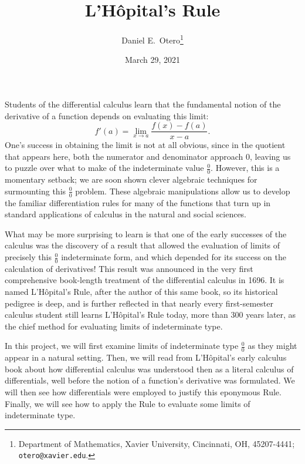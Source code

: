 \message{ !name(LHopitalsRule_2021.03.29.tex)}\documentclass[11pt]{article}
\begin{document}


\title{L'H\^opital's Rule}
\author{Daniel E.~Otero\thanks{Department of Mathematics, Xavier University, Cincinnati, OH, 45207-4441; \texttt{otero@xavier.edu}.
}}
\date{March 29, 2021}
\bigskip



\maketitle

Students of the differential calculus learn that the fundamental notion of the derivative of a function depends on evaluating this limit: $$f'(a)=\lim_{x\to a} \frac{f(x)-f(a)}{x-a}.$$One's success in obtaining the limit is not at all obvious, since in the quotient that appears here, both the numerator and denominator approach $0$, leaving us to puzzle over what to make of the indeterminate value ${\displaystyle \frac00}$. However, this is a momentary setback; we are soon shown clever algebraic techniques for surmounting this ${\displaystyle \frac00}$ problem. These algebraic manipulations allow us to develop the familiar differentiation rules for many of the functions that turn up in standard applications of calculus in the natural and social sciences.

What may be more surprising to learn is that one of the early successes of the calculus was the discovery of a result that allowed the evaluation of limits of precisely this ${\displaystyle \frac00}$ indeterminate form, and which depended for its success on the calculation of derivatives! This result was announced in the very first comprehensive book-length treatment of the differential calculus in 1696. It is named L'H\^opital's Rule, after the author of this same book, so its historical pedigree is deep, and is further reflected in that nearly every first-semester calculus student still learns L'H\^opital's Rule today, more than 300 years later, as the chief method for evaluating limits of indeterminate type.

In this project, we will first examine limits of indeterminate type ${\displaystyle \frac00}$ as they might appear in a natural setting. Then, we will read from L'H\^opital's early calculus book about how differential calculus was understood then as a literal calculus of differentials, well before the notion of a function's derivative was formulated. We will then see how differentials were employed to justify this eponymous Rule. Finally, we will see how to apply the Rule to evaluate some limits of indeterminate type.
\end{document}
